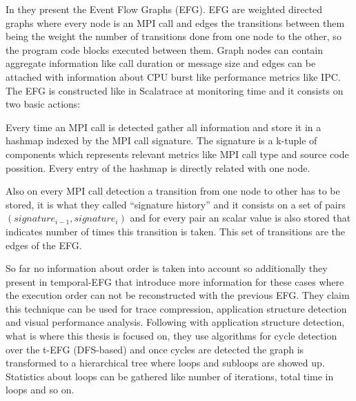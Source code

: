 In \cite{aguilar2014mpi} they present the Event Flow Graphs (EFG). EFG are
weighted directed graphs where every node is an MPI call and edges the
transitions between them being the weight the number of transitions done
from one node to the other, so the program code blocks executed between them.
Graph nodes can contain aggregate information like call duration or message size
and edges can be attached with information about CPU burst like performance
metrics like IPC. 
The EFG is constructed like in Scalatrace at monitoring time and it consists on
two basic actions: 
\begin{enumerate*}[label=\roman*)]
  \item Every time an MPI call is detected gather all information and store it
    in a hashmap indexed by the MPI call signature. The signature is a k-tuple
    of components which represents relevant metrics like MPI call type and
    source code possition. Every entry of the hashmap is directly related with
    one node.
  \item Also on every MPI call detection a transition from one node to other has
    to be stored, it is what they called ``signature history'' and it consists
    on a set of pairs $(signature_{i-1}, signature_{i})$ and for every pair an
    scalar value is also stored that indicates number of times this transition
    is taken. This set of transitions are the edges of the EFG.
\end{enumerate*}

So far no information about order is taken into account
so additionally they present in \cite{aguilar2016event} temporal-EFG that 
introduce more
information for these cases where the execution order can not be reconstructed
with the previous EFG. They claim this technique can be used for trace
compression, application structure detection and visual performance analysis.
Following with application structure detection, what is where this thesis is
focused on, they use algorithms for cycle detection over the t-EFG (DFS-based)
and once cycles are detected the graph is transformed to a hierarchical tree
where loops and subloops are showed up. Statistics about loops can be gathered
like number of iterations, total time in loops and so on.


